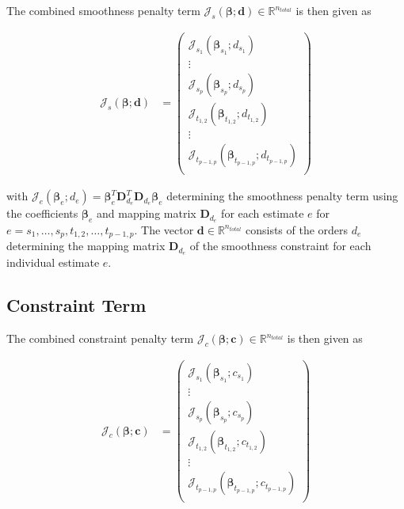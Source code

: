 \documentclass[10pt,a4paper]{article}
\begin{document}
	The combined smoothness penalty term $\boldsymbol{\mathcal{J}}_s(\boldsymbol{\beta}; \boldsymbol{d}) \in \mathbb{R}^{n_{total}}$ is then given as
	
	\begin{align}\label{eq:J_s_ndim}
		\boldsymbol{\mathcal{J}}_s(\boldsymbol{\beta}; \boldsymbol{d}) &= 
			\begin{pmatrix}
				\mathcal J_{s_1}(\boldsymbol{\beta}_{s_1}; d_{s_1}) \\ 
				\vdots \\ 
				\mathcal J_{s_p}(\boldsymbol{\beta}_{s_p}; d_{s_p}) \\
				\mathcal J_{t_{1,2}}(\boldsymbol{\beta}_{t_{1,2}}; d_{t_{1,2}}) \\
				\vdots \\
				\mathcal J_{t_{p-1,p}}(\boldsymbol{\beta}_{t_{p-1,p}}; d_{t_{p-1,p}}) \\
			\end{pmatrix}
	\end{align}
	
	with $\mathcal J_e(\boldsymbol{\beta}_e; d_e) = \boldsymbol{\beta}_e^T \boldsymbol{D}_{d_e}^T \boldsymbol{D}_{d_e} \boldsymbol{\beta}_e$ determining the smoothness penalty term using the coefficients $\boldsymbol{\beta}_e$ and mapping matrix $\boldsymbol{D}_{d_e}$ for each estimate $e$ for $e=s_1, \dots, s_p, t_{1,2}, \dots, t_{p-1,p}$. The vector $\boldsymbol{d} \in \mathbb{R}^{n_{total}}$ consists of the orders $d_e$ determining the mapping matrix $\boldsymbol{D}_{d_e}$ of the smoothness constraint for each individual estimate $e$. 

	\subsection{Constraint Term}
	The combined constraint penalty term $\boldsymbol{\mathcal{J}}_c(\boldsymbol{\beta}; \boldsymbol{c}) \in \mathbb{R}^{n_{total}}$ is then given as
	
	\begin{align}\label{eq:J_c_ndim}
		\boldsymbol{\mathcal{J}}_c(\boldsymbol{\beta}; \boldsymbol{c}) &= 
		\begin{pmatrix}
		\mathcal J_{s_1}(\boldsymbol{\beta}_{s_1}; c_{s_1}) \\ 
		\vdots \\ 
		\mathcal J_{s_p}(\boldsymbol{\beta}_{s_p}; c_{s_p}) \\
		\mathcal J_{t_{1,2}}(\boldsymbol{\beta}_{t_{1,2}}; c_{t_{1,2}}) \\
		\vdots \\
		\mathcal J_{t_{p-1,p}}(\boldsymbol{\beta}_{t_{p-1,p}}; c_{t_{p-1,p}}) \\
		\end{pmatrix}
	\end{align}
\end{document}
